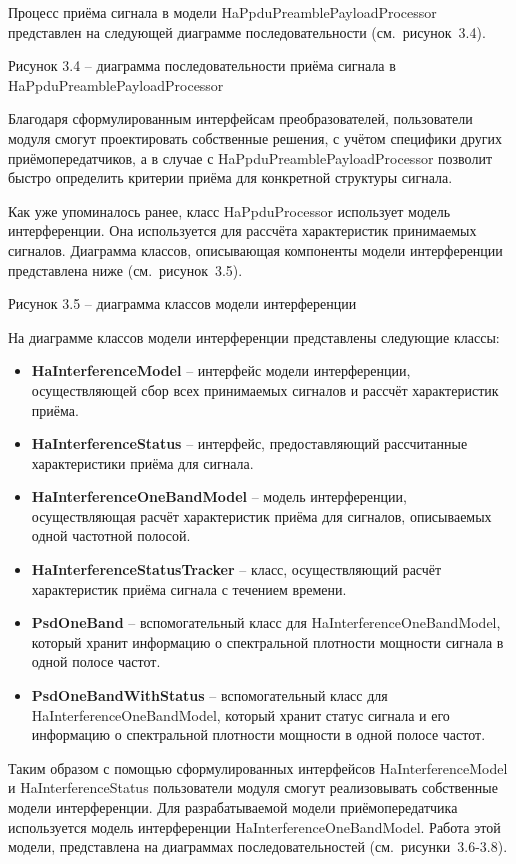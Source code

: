 Процесс приёма сигнала в модели HaPpduPreamblePayloadProcessor
представлен на следующей диаграмме последовательности (см.~рисунок~3.4).

Рисунок 3.4 -- диаграмма последовательности приёма сигнала в
HaPpduPreamblePayloadProcessor

Благодаря сформулированным интерфейсам преобразователей, пользователи
модуля смогут проектировать собственные решения, с учётом специфики
других приёмопередатчиков, а в случае с HaPpduPreamblePayloadProcessor
позволит быстро определить критерии приёма для конкретной структуры
сигнала.

Как уже упоминалось ранее, класс HaPpduProcessor использует модель
интерференции. Она используется для рассчёта характеристик принимаемых
сигналов. Диаграмма классов, описывающая компоненты модели интерференции
представлена ниже (см.~рисунок~3.5).

Рисунок 3.5 -- диаграмма классов модели интерференции

На диаграмме классов модели интерференции представлены следующие классы:

\begin{itemize}
\item
  \textbf{HaInterferenceModel} -- интерфейс модели интерференции,
  осуществляющей сбор всех принимаемых сигналов и рассчёт характеристик
  приёма.
\item
  \textbf{HaInterferenceStatus} -- интерфейс, предоставляющий
  рассчитанные характеристики приёма для сигнала.
\item
  \textbf{HaInterferenceOneBandModel} -- модель интерференции,
  осуществляющая расчёт характеристик приёма для сигналов, описываемых
  одной частотной полосой.
\item
  \textbf{HaInterferenceStatusTracker} -- класс, осуществляющий расчёт
  характеристик приёма сигнала с течением времени.
\item
  \textbf{PsdOneBand} -- вспомогательный класс для
  HaInterferenceOneBandModel, который хранит информацию о спектральной
  плотности мощности сигнала в одной полосе частот.
\item
  \textbf{PsdOneBandWithStatus} -- вспомогательный класс для
  HaInterferenceOneBandModel, который хранит статус сигнала и его
  информацию о спектральной плотности мощности в одной полосе частот.
\end{itemize}

Таким образом с помощью сформулированных интерфейсов HaInterferenceModel
и HaInterferenceStatus пользователи модуля смогут реализовывать
собственные модели интерференции. Для разрабатываемой модели
приёмопередатчика используется модель интерференции
HaInterferenceOneBandModel. Работа этой модели, представлена на
диаграммах последовательностей (см.~рисунки~3.6-3.8).

